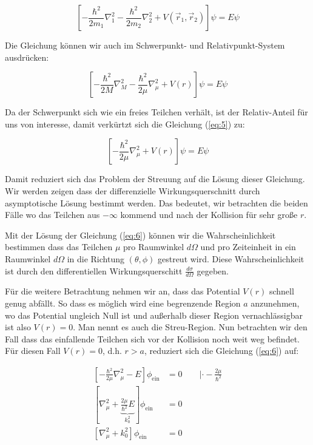 \begin{equation}
  \label{eq:4}
  \left[ - \frac{\hbar^2}{2m_1}\nabla_1^2 - \frac{\hbar^2}{2m_2}\nabla_2^2 +   V(\vec r_1,\vec r_2)\right]\psi = E\psi
\end{equation}

Die Gleichung können wir auch im Schwerpunkt- und Relativpunkt-System ausdrücken:

\begin{equation}
  \label{eq:5}
  \left[ - \frac{\hbar^2}{2M}\nabla_M^2 - \frac{\hbar^2}{2\mu}\nabla_\mu^2 +   V(r)\right]\psi = E\psi
\end{equation}

Da der Schwerpunkt sich wie ein freies Teilchen verhält, ist der Relativ-Anteil für uns von interesse, damit verkürtzt sich die Gleichung (\ref{eq:5}) zu:

\begin{equation}
  \label{eq:6}
  \left[- \frac{\hbar^2}{2\mu}\nabla_\mu^2 +   V(r)\right]\psi = E\psi
\end{equation}


Damit reduziert sich das Problem der Streuung auf die Lösung dieser Gleichung. Wir werden zeigen dass der differenzielle Wirkungsquerschnitt durch asymptotische Lösung bestimmt werden. Das bedeutet, wir betrachten die beiden Fälle wo das Teilchen aus \(-\infty\) kommend und nach der Kollision für sehr große \(r\).


Mit der Lösung der Gleichung (\ref{eq:6}) können wir die Wahrscheinlichkeit bestimmen  dass das Teilchen \(\mu\)  pro Raumwinkel \(d\Omega\) und pro Zeiteinheit in ein Raumwinkel \(d\Omega\) in die Richtung \((\theta,\phi)\) gestreut wird. Diese Wahrscheinlichkeit ist durch den differentiellen Wirkungsquerschitt \(\frac{d\sigma}{d\Omega}\) gegeben.

Für die weitere Betrachtung nehmen wir an, dass das Potential \(V(r)\) schnell genug abfällt. So dass es möglich wird eine begrenzende Region \(a\) anzunehmen, wo das Potential ungleich Null ist und außerhalb dieser Region vernachlässigbar ist also \(V(r)=0\). Man nennt es auch die Streu-Region. Nun betrachten wir den Fall dass das einfallende Teilchen sich vor der Kollision noch weit weg befindet. Für diesen Fall \(V(r)=0\), d.h. \(r > a \), reduziert sich die Gleichung (\ref{eq:6}) auf:

\begin{align}
  \label{eq:7}
  [ -\frac{\hbar^2}{2\mu}\nabla_\mu^2 - E] \phi_{\text{ein}} &= 0 \qquad |\cdot -\frac{2\mu}{\hbar^2} \\
  [ \nabla_\mu^2 +\underbrace{\frac{2\mu}{\hbar^2}  E}_{k_0^2} ] \phi_{\text{ein}} &= 0 \\
  [ \nabla_\mu^2 +k_0^2 ] \phi_{\text{ein}} &= 0
\end{align}

